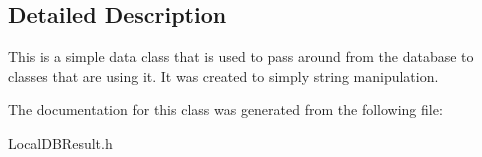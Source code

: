 \subsection{Detailed Description}
This is a simple data class that is used to pass around from the database to classes that are using it. It was created to simply string manipulation. 

The documentation for this class was generated from the following file\-:\begin{DoxyCompactItemize}
\item 
Local\-D\-B\-Result.\-h\end{DoxyCompactItemize}
